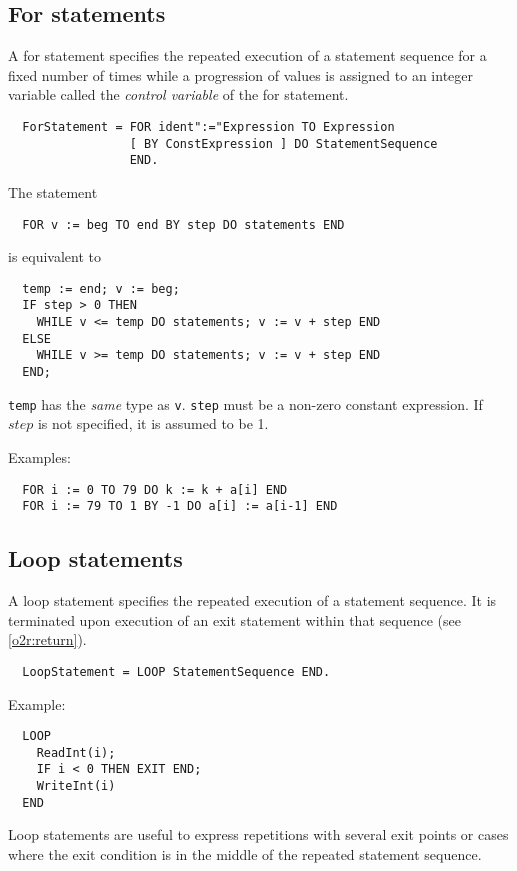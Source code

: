 \subsection{For statements}

A for statement specifies the repeated execution of a statement sequence
for a fixed number of times while a progression of values is assigned
to an integer variable called the {\em control variable} of the for
statement.
{\BNFsize
\begin{verbatim}
  ForStatement = FOR ident":="Expression TO Expression
                 [ BY ConstExpression ] DO StatementSequence
                 END.
\end{verbatim}}
The statement
\begin{verbatim}
  FOR v := beg TO end BY step DO statements END
\end{verbatim}
is equivalent to
\begin{verbatim}
  temp := end; v := beg;
  IF step > 0 THEN
    WHILE v <= temp DO statements; v := v + step END
  ELSE
    WHILE v >= temp DO statements; v := v + step END
  END;
\end{verbatim}
{\tt temp} has the {\em same} type as {\tt v}.
{\tt step} must be a non-zero constant expression.
If $step$ is not specified, it is assumed to be 1.

\noindent
Examples:
\begin{verbatim}
  FOR i := 0 TO 79 DO k := k + a[i] END
  FOR i := 79 TO 1 BY -1 DO a[i] := a[i-1] END
\end{verbatim}

\subsection{Loop statements}

A loop statement specifies the repeated execution of a statement sequence.
It is terminated upon execution of an exit statement within that sequence
(see \ref{o2r:return}).
{\BNFsize
\begin{verbatim}
  LoopStatement = LOOP StatementSequence END.
\end{verbatim}}

\noindent
Example:
\begin{verbatim}
  LOOP
    ReadInt(i);
    IF i < 0 THEN EXIT END;
    WriteInt(i)
  END
\end{verbatim}
Loop statements are useful to express repetitions with several exit
points or cases where the exit condition is in the middle of the repeated
statement sequence.


